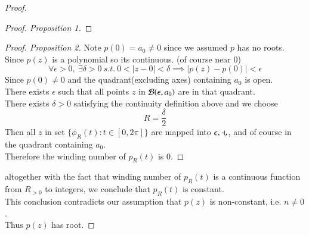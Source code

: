 \documentclass[10pt]{article}
\begin{document}
\begin{proof}
\begin{proof}[Proof. Proposition 1]
			\end{proof}
			\begin{proof}[Proof. Proposition 2]
				Note $p(0) = a_0 \neq 0$ since we assumed $p$ has no roots. \\
				Since $p(z)$ is a polynomial so its continuous. (of course near $0$) \\
				\[
					\forall \epsilon > 0,\ \exists \delta > 0\ s.t.\ 0 < |z - 0| < \delta \implies |p(z) - p(0)| < \epsilon 
				\]
				Since $p(0) \neq 0$ and the quadrant(excluding axes) containing $a_0$ is open.\\
				There exists $\epsilon$ such that all points $z$ in $\mathcal{{B}}(\epsilon, a_0)$ are in that quadrant. \\
				There exists $\delta > 0$ satisfying the continuity definition above and we choose 
				\[
					R = \frac{\delta}{2}
				\]
				Then all $z$ in set $\{\phi_R(t):t\in [0, 2\pi]\}$ are mapped into $\mathcal{{\epsilon, a_0}}$, and of course in the quadrant containing $a_0$.\\
				Therefore the winding number of $p_R(t)$ is 0.
			\end{proof}
			altogether with the fact that winding number of $p_R(t)$ is a continuous function from $R_{>0}$ to integers, we conclude that $p_R(t)$ is constant. \\
			This conclusion contradicts our assumption that $p(z)$ is non-constant, i.e. $n \neq 0$. \\
			Thus $p(z)$ has root.
		\end{proof}
		
\end{document}
